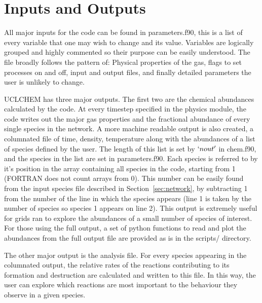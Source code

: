 \documentclass{llncs}
\begin{document}
\section{Inputs and Outputs}
\label{sec:output}
All major inputs for the code can be found in parameters.f90, this is a list of every variable that one may wish to change and its value. Variables are logically grouped and highly commented so their purpose can be easily understood. The file broadly follows the pattern of: Physical properties of the gas, flags to set processes on and off, input and output files, and finally detailed parameters the user is unlikely to change.\par
UCLCHEM has three major outputs. The first two are the chemical abundances calculated by the code. At every timestep specified in the physics module, the code writes  out the major gas properties and the fractional abundance of every single species in the network. A more machine readable output is also created, a columnated file of time, density, temperature along with the abundances of a list of species defined by the user. The length of this list is set by $`nout'$ in chem.f90, and the species in the list are set in parameters.f90. Each species is referred to by it's position in the array containing all species in the code, starting from 1 (FORTRAN does not count arrays from 0). This number can be easily found from the input species file described in Section~\ref{sec:network}, by subtracting 1 from the number of the line in which the species appears (line 1 is taken by the number of species so species 1 appears on line 2). This output is extremely useful for grids ran to explore the abundances of a small number of species of interest. For those using the full output, a set of python functions to read and plot the abundances from the full output file are provided as is in the scripts/ directory.\par
The other major output is the analysis file. For every species appearing in the columnated output, the relative rates of the reactions contributing to its formation and destruction are calculated and written to this file. In this way, the user can explore which reactions are most important to the behaviour they observe in a given species.
%
%
\end{document}
